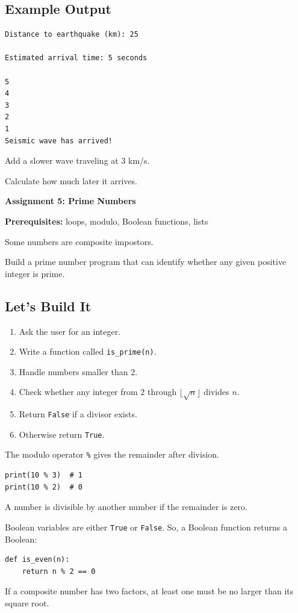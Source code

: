 \documentclass[11pt,letterpaper]{article}
\newcommand{\assignment}[3]{
    \clearpage
    {\Large\bfseries\color{navy} Assignment #1: #2}

    \vspace{2mm}
    {\small\color{darkgray}\textbf{Prerequisites:} #3}

    \vspace{3mm}
}
\newcommand{\steps}{\subsection*{Let's Build It}}
\newcommand{\exampleoutput}{\subsection*{Example Output}}
\begin{document}
\exampleoutput

\begin{lstlisting}[style=outputstyle]
Distance to earthquake (km): 25

Estimated arrival time: 5 seconds

5
4
3
2
1
Seismic wave has arrived!
\end{lstlisting}

\begin{challengebox}
Add a slower wave traveling at 3 km/s.

Calculate how much later it arrives.
\end{challengebox}

\assignment{5}{Prime Numbers}
{loops, modulo, Boolean functions, lists}

\begin{missionbox}
Some numbers are composite impostors.

Build a prime number program that can identify whether any given positive integer is prime.
\end{missionbox}

\steps

\begin{enumerate}
    \item Ask the user for an integer.
    \item Write a function called \texttt{is\_prime(n)}.
    \item Handle numbers smaller than 2.
    \item Check whether any integer from 2 through $\lfloor\sqrt{n}\rfloor$ divides $n$.
    \item Return \texttt{False} if a divisor exists.
    \item Otherwise return \texttt{True}.
\end{enumerate}

\begin{hintbox}
The modulo operator \texttt{\%} gives the remainder after division.

\begin{lstlisting}
print(10 % 3)  # 1
print(10 % 2)  # 0
\end{lstlisting}

A number is divisible by another number if the remainder is zero.

Boolean variables are either \texttt{True} or \texttt{False}. So, a Boolean function returns a Boolean:

\begin{lstlisting}
def is_even(n):
    return n % 2 == 0
\end{lstlisting}

If a composite number has two factors, at least one must be no larger than its square root.
\end{hintbox}
\end{document}
